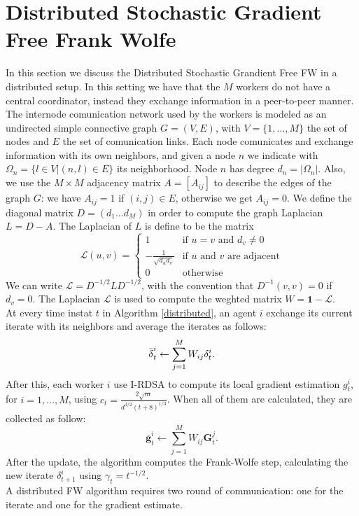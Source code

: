 \section{Distributed Stochastic Gradient Free Frank Wolfe}
In this section we discuss the Distributed Stochastic Grandient Free FW in a distributed setup. In this setting we have that the $M$ workers do not have a central coordinator, instead they exchange information in a peer-to-peer manner. The internode comunication network used by the workers is modeled as an undirected simple connective graph $G=(V,E)$, with $V=\{1, \dots, M\}$ the set of nodes and $E$ the set of comunication links. Each node comunicates and exchange information with its own neighbors, and given a node $n$ we indicate with $\Omega_n = \{l \in V | (n,l)\in E\}$ its neighborhood. Node $n$ has degree $d_n = |\Omega_n|$. Also, we use the $M \times M$ adjacency matrix $A=[A_{ij}]$ to describe the edges of the graph $G$: we have $A_{ij}=1$ if $(i,j) \in E$, otherwise we get $A_{ij}=0$. We define the diagonal matrix $D=(d_1 \dots d_M)$ in order to compute the graph Laplacian $L=D-A$. The Laplacian of $L$ is define to be the matrix
\[
\mathcal{L}(u,v)=
\begin{cases}
	1 & \text{if $u=v$ and }d_v\ne0 \\
	-\frac{1}{\sqrt{d_ud_v}} & \text{if $u$ and $v$ are adjacent}\\
	0 & \text{otherwise}
	
\end{cases}
\]
We can write $\mathcal{L} = D^{-1/2}LD^{-1/2}$, with the convention that $D^{-1}(v,v) = 0$ if $d_v=0$. The Laplacian $\mathcal{L}$ is used to compute the weghted matrix $W = \textbf{1}- \mathcal{L}$.\\
At every time instat $t$ in Algorithm \ref{distributed}, an agent $i$ exchange its current iterate with its neighbors and average the iterates as follows:
\[\bar{\text{\boldmath}\delta}_t^i \leftarrow \sum_{j=1}^{M} W_{ij}\text{\boldmath}\delta_t^i.\]
After this, each worker $i$ use I-RDSA to compute its local gradient estimation $g_t^i$, for $i= 1, \dots, M$, using $c_t = \frac{2\sqrt{m}}{d^{3/2}(t+8)^{1/3}}$. When all of them are calculated, they are collected as follow:
\[ \bar{\textbf{g}}_t^i \leftarrow \sum_{j=1}^{M} W_{ij}\textbf{G}_t^j.\]
After the update, the algorithm computes the Frank-Wolfe step, calculating the new iterate \boldmath$\delta_{t+1}^i$ using $\gamma_t= t^{-1/2}$.\\
A distributed FW algorithm requires two round of communication: one for the iterate and one for the gradient estimate.\\

